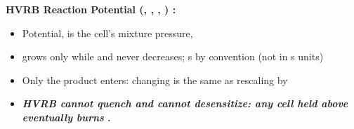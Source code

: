 \documentclass[11pt,addpoints]{exam}
\begin{document}
\clearpage

\begin{tcolorbox}[breakable]
\textbf{HVRB Reaction Potential (, , , ) \cite{starkenberg2010,stewart2024}:}\vspace{.5em}
\begin{itemize}
\item Potential, \hspace{3mm}  \hspace{5mm}  is the cell's mixture pressure, \vspace{1.0em}
\item \bm{$\phi$} grows only while  and never decreases; \hspace{2mm}  \bm{$\mu$}s by convention (not  in \bm{$\mu$}s units)\vspace{.5em}
\item Only the product  enters: \hspace{2mm} changing  is the same as rescaling  by  \hspace{3mm} \cite{starkenberg2014}\vspace{.5em}
\item \textbf{\emph{HVRB cannot quench and cannot desensitize: any cell held above  eventually burns}} \cite{tuttle2018}\textbf{\emph{.}}
\end{itemize}
\end{tcolorbox}
\end{document}
